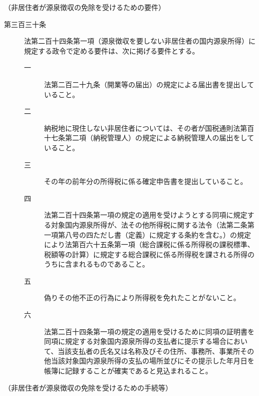 \documentclass[twocolumn,a4j,10pt]{ltjtarticle}
\begin{document}
\noindent\hspace{10pt}（非居住者が源泉徴収の免除を受けるための要件）
\begin{description}
\item[第三百三十条]法第二百十四条第一項（源泉徴収を要しない非居住者の国内源泉所得）に規定する政令で定める要件は、次に掲げる要件とする。
\begin{description}
\item[一]法第二百二十九条（開業等の届出）の規定による届出書を提出していること。
\item[二]納税地に現住しない非居住者については、その者が国税通則法第百十七条第二項（納税管理人）の規定による納税管理人の届出をしていること。
\item[三]その年の前年分の所得税に係る確定申告書を提出していること。
\item[四]法第二百十四条第一項の規定の適用を受けようとする同項に規定する対象国内源泉所得が、法その他所得税に関する法令（法第二条第一項第八号の四ただし書（定義）に規定する条約を含む。）の規定により法第百六十五条第一項（総合課税に係る所得税の課税標準、税額等の計算）に規定する総合課税に係る所得税を課される所得のうちに含まれるものであること。
\item[五]偽りその他不正の行為により所得税を免れたことがないこと。
\item[六]法第二百十四条第一項の規定の適用を受けるために同項の証明書を同項に規定する対象国内源泉所得の支払者に提示する場合において、当該支払者の氏名又は名称及びその住所、事務所、事業所その他当該対象国内源泉所得の支払の場所並びにその提示した年月日を帳簿に記録することが確実であると見込まれること。
\end{description}
\end{description}
\noindent\hspace{10pt}（非居住者が源泉徴収の免除を受けるための手続等）
\end{document}
